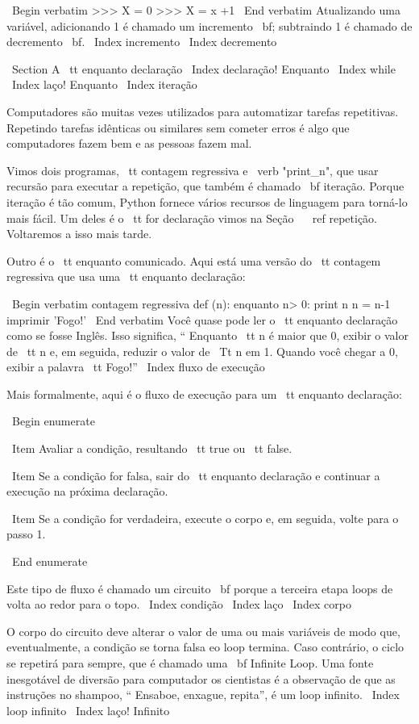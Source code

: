 \documentclass[10pt]{book}
\begin{document}
\begin {itemize}
{{{{\ Begin {verbatim}
>>> X = 0
>>> X = x +1
\ End {verbatim}
%
Atualizando uma variável, adicionando 1 é chamado um incremento {\ bf};
subtraindo 1 é chamado de decremento {\ bf}.
\ Index {incremento}
\ Index {} decremento




\ Section {A {\ tt enquanto} declaração}
\ Index {declaração! Enquanto}
\ Index {while}
\ Index {laço! Enquanto}
\ Index {iteração}

Computadores são muitas vezes utilizados para automatizar tarefas repetitivas. Repetindo
tarefas idênticas ou similares sem cometer erros é algo que
computadores fazem bem e as pessoas fazem mal.

Vimos dois programas, {\ tt contagem regressiva} e \ verb "print_n", que
usar recursão para executar a repetição, que também é chamado {\ bf
iteração}. Porque iteração é tão comum, Python fornece vários
recursos de linguagem para torná-lo mais fácil. Um deles é o {\ tt for} declaração
vimos na Seção ~ \ ref {} repetição. Voltaremos a isso mais tarde.

Outro é o {\ tt enquanto} comunicado. Aqui está uma versão do {\ tt
contagem regressiva} que usa uma {\ tt enquanto} declaração:

\ Begin {verbatim}
contagem regressiva def (n):
    enquanto n> 0:
        print n
        n = n-1
    imprimir 'Fogo!'
\ End {verbatim}
%
Você quase pode ler o {\ tt enquanto} declaração como se fosse Inglês.
Isso significa, `` Enquanto {\ tt n} é maior que 0,
exibir o valor de {\ tt n} e, em seguida, reduzir o valor de
{\ Tt n} em 1. Quando você chegar a 0, exibir a palavra {\ tt Fogo!}''
\ Index {fluxo de execução}

Mais formalmente, aqui é o fluxo de execução para um {\ tt enquanto} declaração:

\ Begin {enumerate}

\ Item Avaliar a condição, resultando {\ tt true} ou {\ tt false}.

\ Item Se a condição for falsa, sair do {\ tt enquanto} declaração
e continuar a execução na próxima declaração.

\ Item Se a condição for verdadeira, execute o
corpo e, em seguida, volte para o passo 1.

\ End {enumerate}

Este tipo de fluxo é chamado um circuito {\ bf} porque a terceira etapa
loops de volta ao redor para o topo.  
\ Index {condição}
\ Index {laço}
\ Index {corpo}

O corpo do circuito deve alterar o valor de uma ou mais variáveis
de modo que, eventualmente, a condição se torna falsa eo loop
termina. Caso contrário, o ciclo se repetirá para sempre, que é chamado
uma {\ bf Infinite Loop}. Uma fonte inesgotável de diversão para computador
os cientistas é a observação de que as instruções no shampoo,
`` Ensaboe, enxague, repita'', é um loop infinito.
\ Index {loop infinito}
\ Index {laço! Infinito}

}}}}
\end{itemize}
\end{document}
